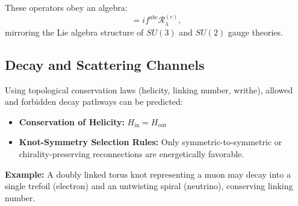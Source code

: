 These operators obey an algebra:
\begin{equation}
[\mathcal{R}^{(a)}_\mu, \mathcal{R}^{(b)}_\nu] = i f^{abc} \mathcal{R}^{(c)}_\lambda,
\end{equation}
mirroring the Lie algebra structure of $SU(3)$ and $SU(2)$ gauge theories.

\subsection{Decay and Scattering Channels}

Using topological conservation laws (helicity, linking number, writhe), allowed and forbidden decay pathways can be predicted:
\begin{itemize}
    \item \textbf{Conservation of Helicity:} $H_{\text{in}} = H_{\text{out}}$
    \item \textbf{Knot-Symmetry Selection Rules:} Only symmetric-to-symmetric or chirality-preserving reconnections are energetically favorable.
\end{itemize}

\textbf{Example:} A doubly linked torus knot representing a muon may decay into a single trefoil (electron) and an untwisting spiral (neutrino), conserving linking number.